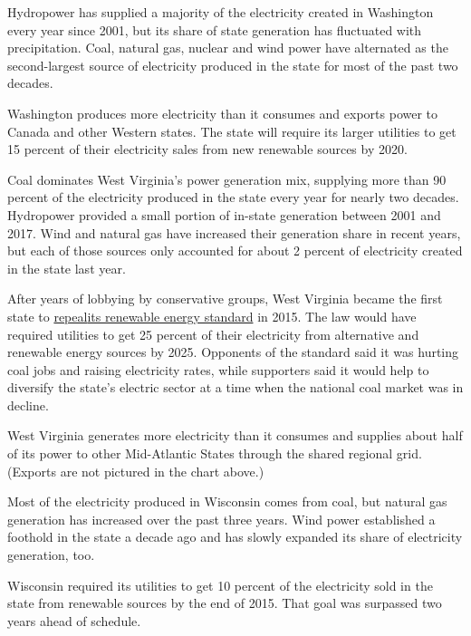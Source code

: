 Hydropower has supplied a majority of the electricity created in
Washington every year since 2001, but its share of state generation has
fluctuated with precipitation. Coal, natural gas, nuclear and wind power
have alternated as the second-largest source of electricity produced in
the state for most of the past two decades.

Washington produces more electricity than it consumes and exports power
to Canada and other Western states. The state will require its larger
utilities to get 15 percent of their electricity sales from new
renewable sources by 2020.

Coal dominates West Virginia's power generation mix, supplying more than
90 percent of the electricity produced in the state every year for
nearly two decades. Hydropower provided a small portion of in-state
generation between 2001 and 2017. Wind and natural gas have increased
their generation share in recent years, but each of those sources only
accounted for about 2 percent of electricity created in the state last
year.

After years of lobbying by conservative groups, West Virginia became the
first state to
\href{https://www.wvgazettemail.com/news/politics/w-va-house-votes-to-repeal-energy-law/article_be7ce0b8-13cd-5bdb-91da-7e679de9c4d5.html}{repeal}\href{https://www.wvgazettemail.com/news/politics/w-va-house-votes-to-repeal-energy-law/article_be7ce0b8-13cd-5bdb-91da-7e679de9c4d5.html}{its
renewable energy standard} in 2015. The law would have required
utilities to get 25 percent of their electricity from alternative and
renewable energy sources by 2025. Opponents of the standard said it was
hurting coal jobs and raising electricity rates, while supporters said
it would help to diversify the state's electric sector at a time when
the national coal market was in decline.

West Virginia generates more electricity than it consumes and supplies
about half of its power to other Mid-Atlantic States through the shared
regional grid. (Exports are not pictured in the chart above.)

Most of the electricity produced in Wisconsin comes from coal, but
natural gas generation has increased over the past three years. Wind
power established a foothold in the state a decade ago and has slowly
expanded its share of electricity generation, too.

Wisconsin required its utilities to get 10 percent of the electricity
sold in the state from renewable sources by the end of 2015. That goal
was surpassed two years ahead of schedule.

